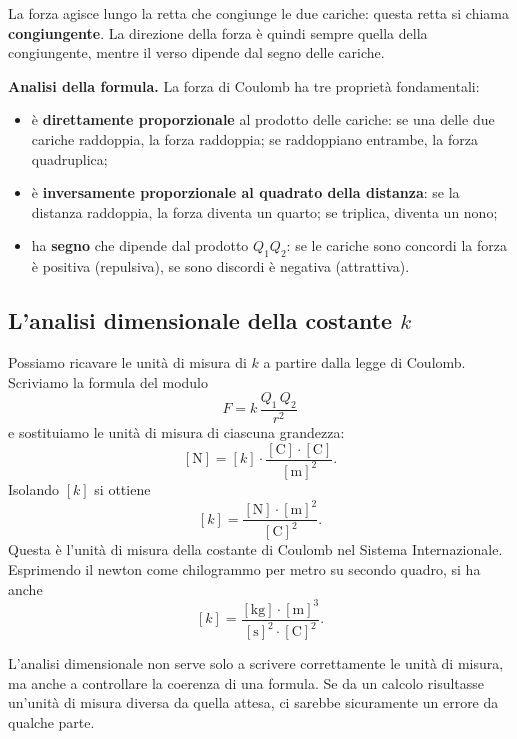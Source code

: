 La forza agisce lungo la retta che congiunge le due cariche: questa retta si chiama \textbf{congiungente}. La direzione della forza è quindi sempre quella della congiungente, mentre il verso dipende dal segno delle cariche.

\begin{concetto}
\textbf{Analisi della formula.} La forza di Coulomb ha tre proprietà fondamentali:
\begin{itemize}[leftmargin=1cm]
  \item è \textbf{direttamente proporzionale} al prodotto delle cariche: se una delle due cariche raddoppia, la forza raddoppia; se raddoppiano entrambe, la forza quadruplica;
  \item è \textbf{inversamente proporzionale al quadrato della distanza}: se la distanza raddoppia, la forza diventa un quarto; se triplica, diventa un nono;
  \item ha \textbf{segno} che dipende dal prodotto \(Q_1 Q_2\): se le cariche sono concordi la forza è positiva (repulsiva), se sono discordi è negativa (attrattiva).
\end{itemize}
\end{concetto}



\subsection{L'analisi dimensionale della costante \(k\)}

Possiamo ricavare le unità di misura di \(k\) a partire dalla legge di Coulomb. Scriviamo la formula del modulo
\[
F = k\,\frac{Q_1\,Q_2}{r^2}
\]
e sostituiamo le unità di misura di ciascuna grandezza:
\[
[\text{N}] = [k] \cdot \frac{[\text{C}] \cdot [\text{C}]}{[\text{m}]^2}.
\]
Isolando \([k]\) si ottiene
\[
[k] = \frac{[\text{N}] \cdot [\text{m}]^2}{[\text{C}]^2}.
\]
Questa è l'unità di misura della costante di Coulomb nel Sistema Internazionale. Esprimendo il newton come chilogrammo per metro su secondo quadro, si ha anche
\[
[k] = \frac{[\text{kg}] \cdot [\text{m}]^3}{[\text{s}]^2 \cdot [\text{C}]^2}.
\]

\begin{curiosita}
L'analisi dimensionale non serve solo a scrivere correttamente le unità di misura, ma anche a controllare la coerenza di una formula. Se da un calcolo risultasse un'unità di misura diversa da quella attesa, ci sarebbe sicuramente un errore da qualche parte.
\end{curiosita}

